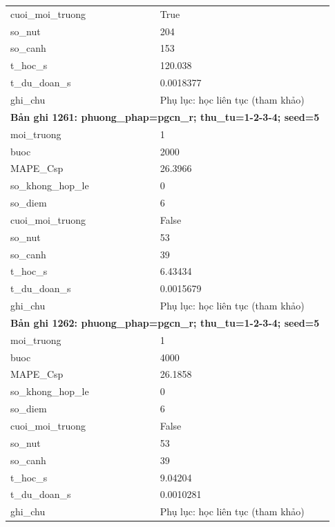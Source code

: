 \begin{longtable}{p{0.43\linewidth}p{0.50\linewidth}}
cuoi\_\allowbreak moi\_\allowbreak truong & True \\
so\_\allowbreak nut & 204 \\
so\_\allowbreak canh & 153 \\
t\_\allowbreak hoc\_\allowbreak s & 120.038 \\
t\_\allowbreak du\_\allowbreak doan\_\allowbreak s & 0.0018377 \\
ghi\_\allowbreak chu & Phụ lục: học liên tục (tham khảo) \\
\midrule
\multicolumn{2}{p{0.95\linewidth}}{\textbf{Bản ghi 1261: phuong\_phap=pgcn\_r; thu\_tu=1-2-3-4; seed=5}} \\
moi\_\allowbreak truong & 1 \\
buoc & 2000 \\
MAPE\_\allowbreak Csp & 26.3966 \\
so\_\allowbreak khong\_\allowbreak hop\_\allowbreak le & 0 \\
so\_\allowbreak diem & 6 \\
cuoi\_\allowbreak moi\_\allowbreak truong & False \\
so\_\allowbreak nut & 53 \\
so\_\allowbreak canh & 39 \\
t\_\allowbreak hoc\_\allowbreak s & 6.43434 \\
t\_\allowbreak du\_\allowbreak doan\_\allowbreak s & 0.0015679 \\
ghi\_\allowbreak chu & Phụ lục: học liên tục (tham khảo) \\
\midrule
\multicolumn{2}{p{0.95\linewidth}}{\textbf{Bản ghi 1262: phuong\_phap=pgcn\_r; thu\_tu=1-2-3-4; seed=5}} \\
moi\_\allowbreak truong & 1 \\
buoc & 4000 \\
MAPE\_\allowbreak Csp & 26.1858 \\
so\_\allowbreak khong\_\allowbreak hop\_\allowbreak le & 0 \\
so\_\allowbreak diem & 6 \\
cuoi\_\allowbreak moi\_\allowbreak truong & False \\
so\_\allowbreak nut & 53 \\
so\_\allowbreak canh & 39 \\
t\_\allowbreak hoc\_\allowbreak s & 9.04204 \\
t\_\allowbreak du\_\allowbreak doan\_\allowbreak s & 0.0010281 \\
ghi\_\allowbreak chu & Phụ lục: học liên tục (tham khảo) \\

\end{longtable}
